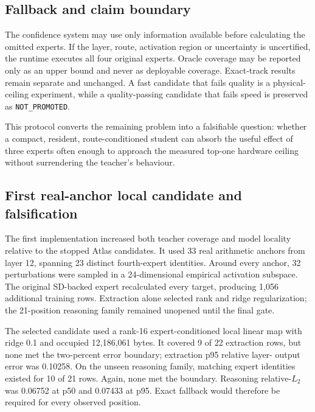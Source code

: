 \subsection{Fallback and claim boundary}

The confidence system may use only information available before calculating
the omitted experts.  If the layer, route, activation region or uncertainty is
uncertified, the runtime executes all four original experts.  Oracle coverage
may be reported only as an upper bound and never as deployable coverage.
Exact-track results remain separate and unchanged.  A fast candidate that
fails quality is a physical-ceiling experiment, while a quality-passing
candidate that fails speed is preserved as \texttt{NOT\_PROMOTED}.

This protocol converts the remaining problem into a falsifiable question:
whether a compact, resident, route-conditioned student can absorb the useful
effect of three experts often enough to approach the measured top-one hardware
ceiling without surrendering the teacher's behaviour.

\subsection{First real-anchor local candidate and falsification}

The first implementation increased both teacher coverage and model locality
relative to the stopped Atlas candidates.  It used 33 real arithmetic anchors
from layer 12, spanning 23 distinct fourth-expert identities.  Around every
anchor, 32 perturbations were sampled in a 24-dimensional empirical activation
subspace.  The original SD-backed expert recalculated every target, producing
1,056 additional training rows.  Extraction alone selected rank and ridge
regularization; the 21-position reasoning family remained unopened until the
final gate.

The selected candidate used a rank-16 expert-conditioned local linear map with
ridge 0.1 and occupied 12,186,061 bytes.  It covered 9 of 22 extraction rows,
but none met the two-percent error boundary; extraction p95 relative layer-
output error was 0.10258.  On the unseen reasoning family, matching expert
identities existed for 10 of 21 rows.  Again, none met the boundary.  Reasoning
relative-$L_2$ was 0.06752 at p50 and 0.07433 at p95.  Exact fallback would
therefore be required for every observed position.

